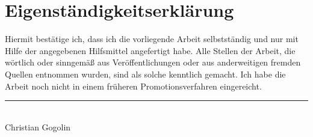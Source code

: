 \documentclass[a4paper,12pt,listof=totoc,index=totoc,bibliography=totoc,headsepline=false,headings=normal,BCOR16.153846mm,DIV12,headinclude,twoside,cleardoublepage=empty,numbers=noenddot,final]{scrreprt}
\theoremstyle{mystyle}
\numberwithin{equation}{section}
\numberwithin{figure}{section}
\numberwithin{lemma}{section}
\numberwithin{theorem}{section}
\numberwithin{corollary}{section}
\numberwithin{definition}{section}
\numberwithin{conjecture}{section}
\numberwithin{observation}{section}
\newcommand{\+}{\mkern2mu}
\DeclareMathOperator{\1}{\mathds{1}}
\begin{document}


\cleardoublepage

\section{Eigenständigkeitserklärung}
%
Hiermit bestätige ich, dass ich die vorliegende Arbeit selbstständig und nur mit Hilfe der angegebenen Hilfsmittel angefertigt habe.
Alle Stellen der Arbeit, die wörtlich oder sinngemäß aus Veröffentlichungen oder aus anderweitigen fremden Quellen entnommen wurden, sind als solche kenntlich gemacht. 
Ich habe die Arbeit noch nicht in einem früheren Promotionsverfahren eingereicht.

{\begin{flushright}\rule{60mm}{0.2pt}\\{\footnotesize Christian Gogolin} \end{flushright}}
\cleardoublepage

\end{document}
